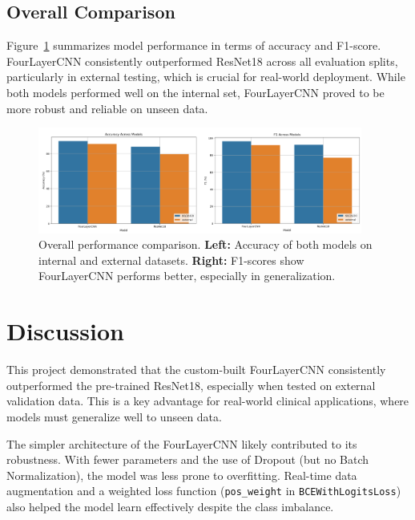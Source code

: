 \documentclass[a4paper,11pt]{article}
\begin{document}
\subsection{Overall Comparison}

Figure~\ref{fig:overall_comparison} summarizes model performance in terms of accuracy and F1-score. FourLayerCNN consistently outperformed ResNet18 across all evaluation splits, particularly in external testing, which is crucial for real-world deployment. While both models performed well on the internal set, FourLayerCNN proved to be more robust and reliable on unseen data.

\begin{figure}[H]
    \centering
    \includegraphics[width=0.95\textwidth]{./Figures/4.png} %
    \caption[Comparison of Accuracy and F1-score across splits]{
        Overall performance comparison. \textbf{Left:} Accuracy of both models on internal and external datasets. \textbf{Right:} F1-scores show FourLayerCNN performs better, especially in generalization.
    }
    \label{fig:overall_comparison}
\end{figure}

\section{Discussion}

This project demonstrated that the custom-built FourLayerCNN consistently outperformed the pre-trained ResNet18, especially when tested on external validation data. This is a key advantage for real-world clinical applications, where models must generalize well to unseen data.

\vspace{0.2cm}The simpler architecture of the FourLayerCNN likely contributed to its robustness. With fewer parameters and the use of Dropout (but no Batch Normalization), the model was less prone to overfitting. Real-time data augmentation and a weighted loss function (\texttt{pos\_weight} in \texttt{BCEWithLogitsLoss}) also helped the model learn effectively despite the class imbalance.
\end{document}
